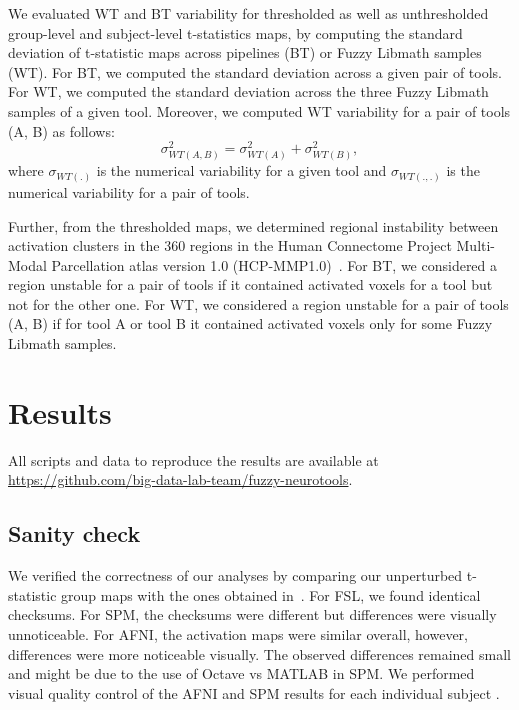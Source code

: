 \documentclass[conference]{IEEEtran}
\begin{document}
We evaluated WT and BT variability for thresholded as well as unthresholded
group-level and subject-level t-statistics maps, by computing the
standard deviation of t-statistic maps across pipelines (BT) or Fuzzy Libmath samples (WT). For BT, we computed the standard deviation 
across a given pair of tools.
For WT, we computed the standard deviation across the three
Fuzzy Libmath samples of a given tool. Moreover, we computed WT variability for a pair of tools (A, B) as follows:
\begin{equation}
  \sigma_{WT(A,B)}^2 = \sigma_{WT(A)}^2 + \sigma_{WT(B)}^2,
  \label{eq:wt-pair}
\end{equation}
where $\sigma_{WT(.)}$ is the numerical variability for a given tool
and $\sigma_{WT(., .)}$ is the numerical variability for a pair of tools.

Further, from the thresholded maps, we determined regional instability
between activation clusters in the 360 regions in the Human Connectome
Project Multi-Modal Parcellation atlas version 1.0
(HCP-MMP1.0)~\cite{glasser2016multi}. For BT, we considered a region
unstable for a pair of tools if it contained activated voxels for a tool
but not for the other one. For WT, we considered a region unstable for a
pair of tools (A, B) if for tool A or tool B it contained activated voxels only for some Fuzzy Libmath
samples.

\section{Results}
All scripts and data to reproduce the results are
available at \url{https://github.com/big-data-lab-team/fuzzy-neurotools}.


\subsection{Sanity check}

We verified the correctness of our analyses by comparing our unperturbed
t-statistic group maps with the ones obtained
in~\cite{bowring2019exploring}. For FSL, we found
identical checksums. For SPM, the checksums were different but differences
were visually unnoticeable. For AFNI, the activation maps were similar
overall, however, differences were more noticeable visually. 
The observed
differences remained small and might be due to the use of Octave vs MATLAB in
SPM. We performed visual quality control of the AFNI and SPM results
for each individual subject .
\end{document}
